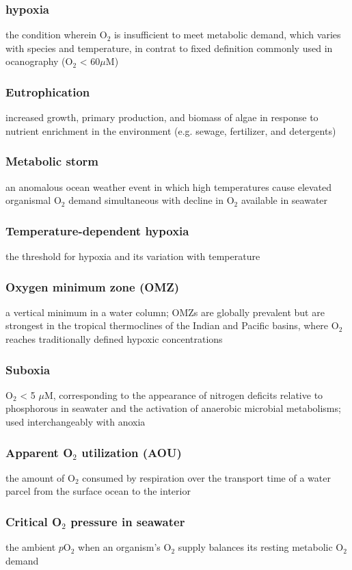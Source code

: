 \subsubsection{hypoxia}
the condition wherein O$_2$ is insufficient to meet metabolic demand, which
varies with species and temperature, in contrat to fixed definition
commonly used in ocanography (O$_2$ < 60$\mu$M)

\subsubsection{Eutrophication}
increased growth, primary production, and biomass of algae in response to
nutrient enrichment in the environment (e.g. sewage, fertilizer, and
detergents)

\subsubsection{Metabolic storm}
an anomalous ocean weather event in which high temperatures cause elevated
organismal O$_2$ demand simultaneous with decline in O$_2$ available in
seawater

\subsubsection{Temperature-dependent hypoxia}
the threshold for hypoxia and its variation with temperature

\subsubsection{Oxygen minimum zone (OMZ)}
a vertical minimum in a water column; OMZs are globally prevalent but are
strongest in the tropical thermoclines of the Indian and Pacific basins, where
O$_2$ reaches traditionally defined hypoxic concentrations

\subsubsection{Suboxia}
O$_2$ < 5 $\mu$M, corresponding to the appearance of nitrogen deficits
relative to phosphorous in seawater and the activation of anaerobic microbial
metabolisms; used interchangeably with anoxia

\subsubsection{Apparent O$_2$ utilization (AOU)}
the amount of O$_2$ consumed by respiration over the transport time of a
water parcel from the surface ocean to the interior

\subsubsection{Critical O$_2$ pressure in seawater}
the ambient $p$O$_2$ when an organism's O$_2$ supply balances its resting
metabolic O$_2$ demand
